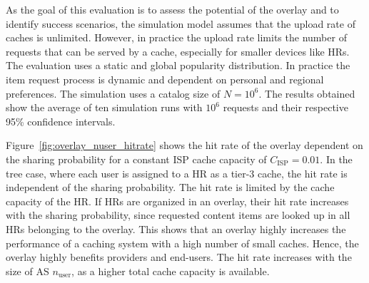 As the goal of this evaluation is to assess the potential of the overlay and to identify success scenarios, the simulation model assumes that the upload rate of caches is unlimited. However, in practice the upload rate limits the number of requests that can be served by a cache, especially for smaller devices like HRs. The evaluation uses a static and global popularity distribution. In practice the item request process is dynamic and dependent on personal and regional preferences.
The simulation uses a catalog size of $N=10^6$. The results obtained show the average of ten simulation runs with $10^6$ requests and their respective 95\% confidence intervals.

Figure~\ref{fig:overlay_nuser_hitrate} shows the hit rate of the overlay dependent on the sharing probability for a constant ISP cache capacity of $C_\text{ISP}=0.01$. In the tree case, where each user is assigned to a HR as a tier-3 cache, the hit rate is independent of the sharing probability. The hit rate is limited by the cache capacity of the HR. If HRs are organized in an overlay, their hit rate increases with the sharing probability, since requested content items are looked up in all HRs belonging to the overlay. This shows that an overlay highly increases the performance of a caching system with a high number of small caches. Hence, the overlay highly benefits providers and end-users. The hit rate increases with the size of AS $n_\text{user}$, as a higher total cache capacity is available.


